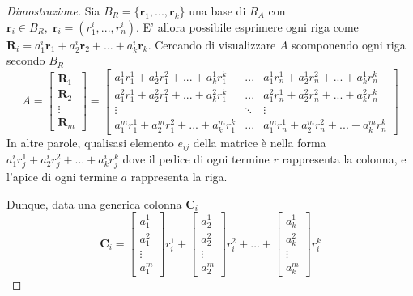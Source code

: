     \begin{proof}[Dimostrazione]
        Sia $B_R = \{\mathbf{r}_{1}, ..., \mathbf{r}_{k}\}$ una base di $R_A$ con $\mathbf{r}_{i} \in B_R, \; \mathbf{r}_{i} = (r_{1}^{i}, ..., r_{n}^{i})$. E' allora possibile esprimere ogni riga come $\mathbf{R}_{i} = a_{1}^{i} \mathbf{r}_{1} + a_{2}^{i} \mathbf{r}_{2} + ... + a_{k}^{i} \mathbf{r}_{k}$.
        Cercando di visualizzare $A$ scomponendo ogni riga secondo $B_R$
        \[
            A =
            \begin{bmatrix}
                \mathbf{R}_{1} \\
                \mathbf{R}_{2} \\
                \vdots \\
                \mathbf{R}_{m}
            \end{bmatrix}
            =
            \begin{bmatrix}
                a_{1}^{1} r_{1}^{1} + a_{2}^{1} r_{1}^{2} + ... + a_{k}^{1} r_{1}^{k} & ... & a_{1}^{1} r_{n}^{1} + a_{2}^{1} r_{n}^{2} + ... + a_{k}^{1} r_{n}^{k} \\
                a_{1}^{2} r_{1}^{1} + a_{2}^{2} r_{1}^{2} + ... + a_{k}^{2} r_{1}^{k} & ... & a_{1}^{2} r_{n}^{1} + a_{2}^{2} r_{n}^{2} + ... + a_{k}^{2} r_{n}^{k} \\
                \vdots & \ddots & \vdots \\
                a_{1}^{m} r_{1}^{1} + a_{2}^{m} r_{1}^{2} + ... + a_{k}^{m} r_{1}^{k} & ... & a_{1}^{m} r_{n}^{1} + a_{2}^{m} r_{n}^{2} + ... + a_{k}^{m} r_{n}^{k}
            \end{bmatrix}
        \]
        In altre parole, qualisasi elemento $e_{ij}$ della matrice è nella forma $a_{1}^{i} r_{j}^{1} + a_{2}^{i} r_{j}^{2} + ... + a_{k}^{i} r_{j}^{k}$ dove il pedice di ogni termine $r$ rappresenta la colonna, e l'apice di ogni termine $a$ rappresenta la riga.

        Dunque, data una generica colonna $\mathbf{C}_{i}$
        \[
            \mathbf{C}_{i} =
            \begin{bmatrix}
                a_{1}^{1} \\
                a_{1}^{2} \\
                \vdots \\
                a_{1}^{m}
            \end{bmatrix}
            r_{i}^{1}
            +
            \begin{bmatrix}
                a_{2}^{1} \\
                a_{2}^{2} \\
                \vdots \\
                a_{2}^{m}
            \end{bmatrix}
            r_{i}^{2}
            +
            \dots
            +
            \begin{bmatrix}
                a_{k}^{1} \\
                a_{k}^{2} \\
                \vdots \\
                a_{k}^{m}
            \end{bmatrix}
            r_{i}^{k}
        \]


\end{proof}
